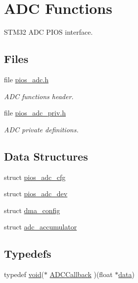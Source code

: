 \hypertarget{group___p_i_o_s___a_d_c}{\section{A\-D\-C Functions}
\label{group___p_i_o_s___a_d_c}
}


S\-T\-M32 A\-D\-C P\-I\-O\-S interface.  


\subsection*{Files}
\begin{DoxyCompactItemize}
\item 
file \hyperlink{pios__adc_8h}{pios\-\_\-adc.\-h}
\begin{DoxyCompactList}\small\item\em A\-D\-C functions header. \end{DoxyCompactList}\item 
file \hyperlink{pios__adc__priv_8h}{pios\-\_\-adc\-\_\-priv.\-h}
\begin{DoxyCompactList}\small\item\em A\-D\-C private definitions. \end{DoxyCompactList}\end{DoxyCompactItemize}
\subsection*{Data Structures}
\begin{DoxyCompactItemize}
\item 
struct \hyperlink{structpios__adc__cfg}{pios\-\_\-adc\-\_\-cfg}
\item 
struct \hyperlink{structpios__adc__dev}{pios\-\_\-adc\-\_\-dev}
\item 
struct \hyperlink{structdma__config}{dma\-\_\-config}
\item 
struct \hyperlink{structadc__accumulator}{adc\-\_\-accumulator}
\end{DoxyCompactItemize}
\subsection*{Typedefs}
\begin{DoxyCompactItemize}
\item 
typedef \hyperlink{group___n_a_m_e_ga18028b8badbf1ea7e704ccac3c488e82}{void}($\ast$ \hyperlink{group___p_i_o_s___a_d_c_ga20bf90833813c2c4945fab90c8e4f386}{A\-D\-C\-Callback} )(float $\ast$\hyperlink{pios__opahrs__proto_8h_a20e3f4bfaeccf09a75ef27e095a10112}{data})
\end{DoxyCompactItemize}
